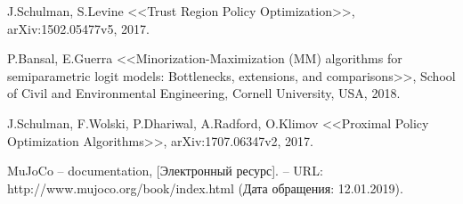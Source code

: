 \begin{thebibliography}{99}
	J.Schulman, S.Levine
	<<Trust Region Policy Optimization>>,
	arXiv:1502.05477v5, 
	2017.

	P.Bansal, E.Guerra
	<<Minorization-Maximization (MM) algorithms for semiparametric logit models: Bottlenecks, extensions, and comparisons>>,
	School of Civil and Environmental Engineering, Cornell University, USA, 
	2018.
	
	J.Schulman, F.Wolski, P.Dhariwal, A.Radford, O.Klimov
	<<Proximal Policy Optimization Algorithms>>,
	arXiv:1707.06347v2, 
	2017.

	MuJoCo -- documentation,
	[Электронный ресурс]. --
	URL: http://www.mujoco.org/book/index.html
	(Дата обращения: 12.01.2019).

\end{thebibliography}
\endgroup

\clearpage
